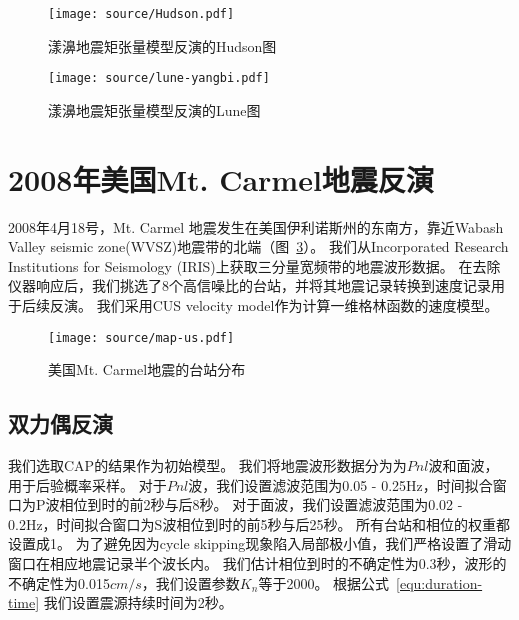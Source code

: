 \begin{figure}[h]
    \centering
    \texttt{[image: source/Hudson.pdf]}
    \caption{漾濞地震矩张量模型反演的Hudson图}
    \label{fig:Hudson}
\end{figure}


\begin{figure}[h]
    \centering
    \texttt{[image: source/lune-yangbi.pdf]}
    \caption{漾濞地震矩张量模型反演的Lune图}
    \label{fig:lune-yangbi}
\end{figure}



\section{2008年美国Mt. Carmel地震反演}

2008年4月18号，Mt. Carmel 地震发生在美国伊利诺斯州的东南方，靠近Wabash Valley seismic zone(WVSZ)地震带的北端（图~\ref{fig:map-us}）。
我们从Incorporated Research Institutions for Seismology (IRIS)上获取三分量宽频带的地震波形数据。
在去除仪器响应后，我们挑选了8个高信噪比的台站，并将其地震记录转换到速度记录用于后续反演。
我们采用CUS velocity model\citep{Herrmann1979}作为计算一维格林函数的速度模型。

\begin{figure}[h]
    \centering
    \texttt{[image: source/map-us.pdf]}
    \caption{美国Mt. Carmel地震的台站分布}
    \label{fig:map-us}
\end{figure}



\subsection{双力偶反演}

我们选取CAP的结果\citep{He2018}作为初始模型。
我们将地震波形数据分为为$Pnl$波和面波，用于后验概率采样。
对于$Pnl$波，我们设置滤波范围为0.05 - 0.25Hz，时间拟合窗口为P波相位到时的前2秒与后8秒。
对于面波，我们设置滤波范围为0.02 - 0.2Hz，时间拟合窗口为S波相位到时的前5秒与后25秒。
所有台站和相位的权重都设置成1。
为了避免因为cycle skipping现象陷入局部极小值，我们严格设置了滑动窗口在相应地震记录半个波长内。
我们估计相位到时的不确定性为0.3秒，波形的不确定性为0.015$cm/s$，我们设置参数$K_n$等于2000。
根据公式~\ref{equ:duration-time} 我们设置震源持续时间为2秒。


